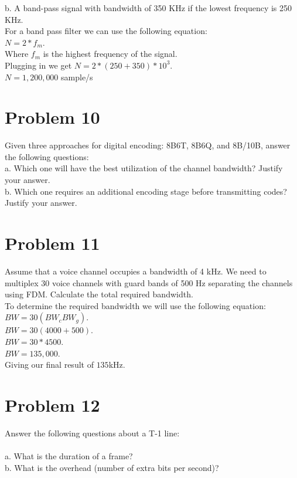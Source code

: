 \documentclass{article}
\begin{document}
\subP b. A band-pass signal with bandwidth of 350 KHz if the lowest
frequency is 250 KHz.\\
For a band pass filter we can use the following equation:\\
$N = 2*f_{m}$.\\
Where $f_{m}$ is the highest frequency of the signal.\\
Plugging in we get $N = 2*(250 + 350) * 10^{3}$.\\
$N = 1,200,000$ sample/s\\


\section*{Problem 10}
Given three approaches for digital encoding: 8B6T, 8B6Q, and 8B/10B, answer the
following questions:\\
\subP a. Which one will have the best utilization of the channel bandwidth? Justify your answer.\\
\subP b. Which one requires an additional encoding stage before transmitting codes? Justify your
answer.\\

\section*{Problem 11} %
Assume that a voice channel occupies a bandwidth of 4 kHz. We need to multiplex 30 voice
channels with guard bands of 500 Hz separating the channels using FDM. Calculate the total
required bandwidth.\\
To determine the required bandwidth we will use the following equation:\\
$BW = 30(BW_{c} BW_{g})$.\\
$BW = 30(4000 + 500)$.\\
$BW = 30 * 4500$.\\
$BW = 135,000$.\\
Giving our final result of $135$kHz.\\

\section*{Problem 12} %
Answer the following questions about a T-1 line:\\\\
\subP a. What is the duration of a frame?\\
\subP b. What is the overhead (number of extra bits per second)?\\
\end{document}

